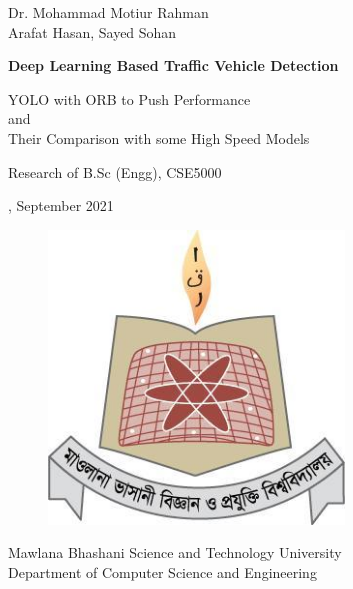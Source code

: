 

{\Large \noindent \color{Test3} Dr. Mohammad Motiur Rahman \\ Arafat Hasan, Sayed Sohan} \newline

\vspace{1cm}

{\begin{flushleft}
\fontsize{21.8}{26.16} \selectfont \bfseries \noindent 
Deep Learning Based Traffic Vehicle Detection 
\end{flushleft}}

\vspace{3mm}

{\LARGE \noindent YOLO with ORB to Push Performance \vspace{1.0mm} \\ 
  and \vspace{1.0mm} \\
  Their Comparison with some High Speed Models \vspace{1.0mm}\\
\newline}

\vspace{5.7cm}


\noindent  \newline 
Research of B.Sc (Engg), CSE5000

, September 2021 \newline


\vspace{1.5cm}

\begin{minipage}{0.3\textwidth}
\begin{figure}[H]
\noindent \includegraphics[width=0.7\textwidth]{figures/mbstu.jpg}
\end{figure}
\end{minipage} \hfill
\begin{minipage}{0.7\textwidth}
\vspace{.5cm}
\noindent Mawlana Bhashani Science and Technology University  \\
Department of Computer Science and Engineering
\end{minipage}

